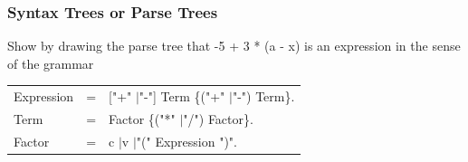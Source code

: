 \documentclass{beamer}
\theoremstyle{remark}
\newenvironment{grammar}
	{\begin{tabular}[b]{lcl}}
	{\end{tabular}}
\newcommand{\alternative}{$\mid$}
\begin{document}

\begin{frame}
	\frametitle{Syntax Trees or Parse Trees}
	
	Show by drawing the parse tree that  -5 + 3 * (a - x) is an expression in the sense of the grammar
	
			\begin{grammar}
			Expression & = & ["+" \alternative "-"] Term \{("+" \alternative "-") Term\}. \\
			Term & = & Factor \{("*" \alternative "/") Factor\}. \\
			Factor & = & c \alternative v \alternative "(" Expression ")".
		\end{grammar}

\end{frame}
\end{document}

